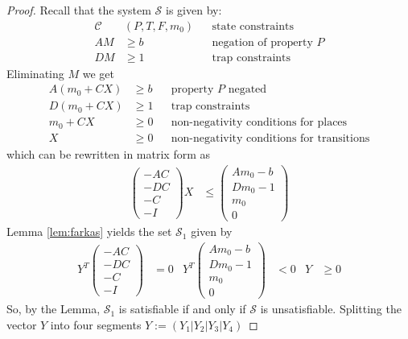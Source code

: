 \begin{proof}
Recall that the system $\mathcal{S}$ is given by:
\begin{align*}
  \mathcal{C}&(P, T, F, m_0)  && \text{state constraints} \\
  A M & \ge b                 && \text{negation of property $P$} \\
  D M & \ge 1                 && \text{trap constraints}
\end{align*}
Eliminating $M$ we get
\begin{align*}
A (m_0 + C X) & \ge b && \text{property $P$ negated} \\
D (m_0 + C X) & \ge 1 && \text{trap constraints} \\
   m_0 + C X  & \ge 0 && \text{non-negativity conditions for places} \\
           X  & \ge 0 && \text{non-negativity conditions for transitions}
\end{align*}
which can be rewritten in matrix form as
%
\begin{align*}
\begin{pmatrix}
  -  A  C \\
  -  D  C \\
  -     C \\
  -     I
\end{pmatrix} X & \le
\begin{pmatrix}
  A m_0 - b \\
  D m_0 - 1 \\
    m_0     \\
     0
\end{pmatrix}
\end{align*}
%
Lemma \ref{lem:farkas} yields the set $\mathcal{S}_1$ given by  
%
\begin{align*}
  Y^T
\begin{pmatrix}
  -  A  C \\
  -  D  C \\
  -     C \\
  -     I
\end{pmatrix} & = 0  &
  Y^T
\begin{pmatrix}
  A m_0 - b \\
  D m_0 - 1 \\
    m_0     \\
     0
\end{pmatrix} & < 0  &
Y & \ge 0
\end{align*}
So, by the Lemma, $\mathcal{S}_1$ is satisfiable if and only if $\mathcal{S}$ is unsatisfiable. 
Splitting the vector $Y$ into four segments $Y := (Y_1|Y_2|Y_3|Y_4)$ 

\end{proof}
